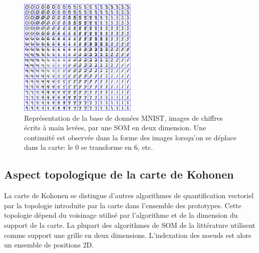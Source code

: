 \documentclass[../main]{subfiles}
\begin{document}



\begin{figure}
\centering
\includegraphics[width=0.5\textwidth]{digits.jpg}
\caption{Représentation de la base de données MNIST, images de chiffres écrits à main levées, par une SOM en deux dimension. Une continuité est observée dans la forme des images lorsqu'on se déplace dans la carte: le $0$ se transforme en $6$, etc.}
\label{fig:SOM}
\end{figure}

\subsection{Aspect topologique de la carte de Kohonen}

La carte de Kohonen se distingue d'autres algorithmes de quantification vectoriel par la topologie introduite par la carte dans l'ensemble des prototypes. Cette topologie dépend du voisinage utilisé par l'algorithme et de la dimension du support de la carte.
La plupart des algorithmes de SOM de la littérature utilisent comme support une grille en deux dimensions. L'indexation des noeuds est alors un ensemble de positions 2D.
\end{document}
